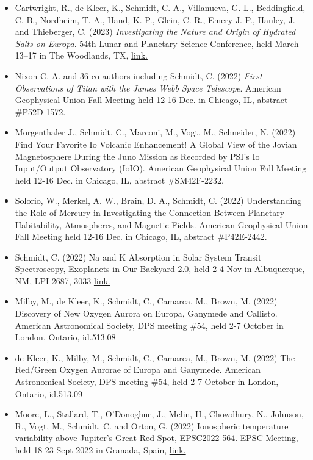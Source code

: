 \documentclass[12pt]{report}
\begin{document}
\begin{itemize}
   \item Cartwright, R., de Kleer, K., Schmidt, C. A., Villanueva, G. L., Beddingfield, C. B., Nordheim, T. A., Hand, K. P., Glein, C. R., Emery J. P., Hanley, J. and Thieberger, C. (2023) \textit{Investigating the Nature and Origin of Hydrated Salts on Europa}. 54th Lunar and Planetary Science Conference, held March 13–17 in The Woodlands, TX, \href{https://www.hou.usra.edu/meetings/lpsc2023/pdf/2215.pdf/}{link.}
   \item Nixon C. A. and 36 co-authors including Schmidt, C. (2022) \textit{First Observations of Titan with the James Webb Space Telescope}.  American Geophysical Union Fall Meeting held 12-16 Dec. in Chicago, IL, abstract \#P52D-1572.
   \item Morgenthaler J., Schmidt, C., Marconi, M., Vogt, M., Schneider, N. (2022) Find Your Favorite Io Volcanic Enhancement! A Global View of the Jovian Magnetosphere During the Juno Mission as Recorded by PSI's Io Input/Output Observatory (IoIO). American Geophysical Union Fall Meeting held 12-16 Dec. in Chicago, IL, abstract \#SM42F-2232.
   \item Solorio, W., Merkel, A. W., Brain, D. A., Schmidt, C. (2022) Understanding the Role of Mercury in Investigating the Connection Between Planetary Habitability, Atmospheres, and Magnetic Fields. American Geophysical Union Fall Meeting held 12-16 Dec. in Chicago, IL, abstract \#P42E-2442.
   \item Schmidt, C. (2022) Na and K Absorption in Solar System Transit Spectroscopy, Exoplanets in Our Backyard 2.0, held 2-4 Nov in Albuquerque, NM, LPI 2687, 3033 \href{https://www.hou.usra.edu/meetings/exoplanets2022/pdf/3033.pdf}{link.} 
   \item Milby, M., de Kleer, K., Schmidt, C., Camarca, M., Brown, M. (2022) Discovery of New Oxygen Aurora on Europa, Ganymede and Callisto. American Astronomical Society, DPS meeting \#54, held 2-7 October in London, Ontario, id.513.08
   \item de Kleer, K., Milby, M., Schmidt, C., Camarca, M., Brown, M. (2022) The Red/Green Oxygen Aurorae of Europa and Ganymede. American Astronomical Society, DPS meeting \#54, held 2-7 October in London, Ontario, id.513.09
   \item Moore, L., Stallard, T., O'Donoghue, J., Melin, H., Chowdhury, N., Johnson, R., Vogt, M.,  Schmidt, C. and Orton, G. (2022) Ionospheric temperature variability above Jupiter's Great Red Spot, EPSC2022-564. EPSC Meeting, held 18-23 Sept 2022 in Granada, Spain, \href{https://meetingorganizer.copernicus.org/epsc2022/sessionprogramme}{link.}

\end{itemize}
\end{document}
